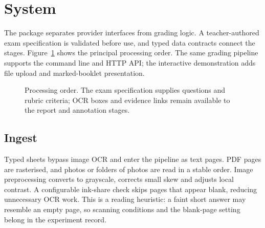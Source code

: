 \section{System}
\label{sec:system}
The package separates provider interfaces from grading logic. A teacher-authored exam specification is validated before use, and typed data contracts connect the stages. Figure~\ref{fig:pipeline} shows the principal processing order. The same grading pipeline supports the command line and HTTP API; the interactive demonstration adds file upload and marked-booklet presentation.

\begin{figure}[htbp]
\centering
{}
\caption{Processing order. The exam specification supplies questions and rubric criteria; OCR boxes and evidence links remain available to the report and annotation stages.}
\label{fig:pipeline}
\end{figure}

\subsection{Ingest}
Typed sheets bypass image OCR and enter the pipeline as text pages. PDF pages are rasterised, and photos or folders of photos are read in a stable order. Image preprocessing converts to grayscale, corrects small skew and adjusts local contrast. A configurable ink-share check skips pages that appear blank, reducing unnecessary OCR work. This is a reading heuristic: a faint short answer may resemble an empty page, so scanning conditions and the blank-page setting belong in the experiment record.

